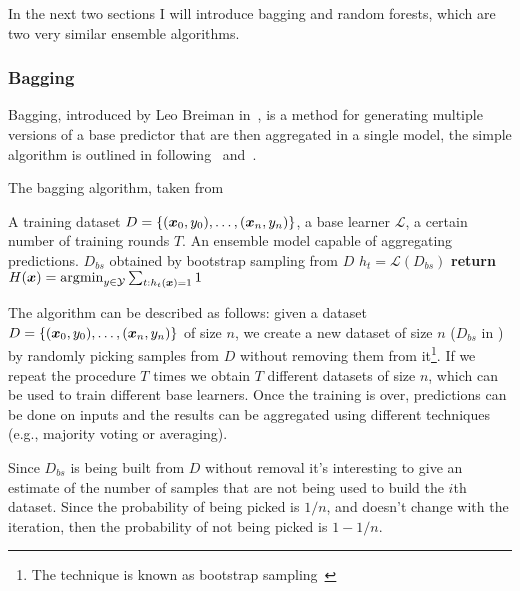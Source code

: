 In the next two sections I will introduce bagging and random forests, which are two very similar
ensemble algorithms.

\subsubsection{Bagging}

Bagging, introduced by Leo Breiman in~\cite{Breiman1996}, is a method for generating multiple
versions of a base predictor that are then aggregated in a single model, the simple algorithm is
outlined in  following~\cite{ZhouZhi-Hua2021ML} and~\cite{Bauer1999}.
\begin{algorithm}
	\caption{The bagging algorithm, taken from~\cite{Bauer1999}}\label{algo:bagging}
	\begin{algorithmic}[1]
		\Require A training dataset $D = \{(\boldsymbol{x}_0, y_0), \ldots, (\boldsymbol{x}_n, y_n)\}$, a base learner $\mathcal{L}$, a certain number
		of training rounds $T$.
		\Ensure An ensemble model capable of aggregating predictions.
		\State $D_{bs}$ obtained by bootstrap sampling from $D$
		\State $h_t = \mathcal{L}(D_{bs})$ 
		\EndFor
		\State \textbf{return} $H(\boldsymbol{x}) = \operatorname*{\arg\!\min}_{y \in \mathcal{Y}}\sum_{t : h_t(\boldsymbol{x}) =
		1} 1$
		\EndFunction
	\end{algorithmic}
\end{algorithm}

The algorithm can be described as follows: given a dataset $D = \{(\boldsymbol{x}_0, y_0), \ldots, (\boldsymbol{x}_n, y_n)\}$ of size $n$, we create a new
dataset of size $n$ ($D_{bs}$ in ) by randomly picking samples from $D$ without
removing them from it\footnote{The technique is known as bootstrap sampling~\cite{ZhouZhi-Hua2021ML}}. If we repeat the procedure $T$ times we obtain $T$ different datasets of size $n$, which can be used to train different base learners. Once the training is over, predictions can be done on inputs and the results can be aggregated using different techniques (e.g., majority voting or averaging).

\medskip

Since $D_{bs}$ is being built from $D$ without removal it's interesting to give an
estimate of the number of samples that are not being used to build the $i$th dataset. Since the
probability of being picked is $1 / n$, and doesn't change with the iteration, then the probability of not being picked is $1 - 1 / n$.

